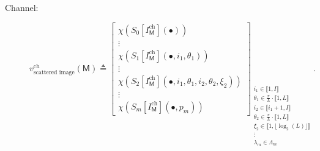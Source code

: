 \begin{description}
                \item[Channel:]
                        \begin{equation}
                            \label{eq::channel_scatnet_image_based_features}
                            v^{\text{ch}}_{\text{scattered image}}\left(\mathsf{M}\right) \triangleq \begin{bmatrix}
                                \chi \left(S_0[I^{\text{ch}}_{\mathsf{M}}]\left(\bullet\right)\right)\\
                                \vdots\\
                                \chi \left(S_1[I^{\text{ch}}_{\mathsf{M}}]\left(\bullet, i_1, \theta_1\right)\right)\\
                                \vdots\\
                                \chi \left(S_2[I^{\text{ch}}_{\mathsf{M}}]\left(\bullet, i_1, \theta_1, i_2, \theta_2, \xi_2\right)\right)\\
                                \vdots\\
                                \chi \left(S_m[I^{\text{ch}}_{\mathsf{M}}]\left(\bullet, p_m\right)\right)
                            \end{bmatrix}_{
                                \substack{
                                    i_1 \in \llbracket 1, I \rrbracket\\
                                    \theta_1 \in \frac{\pi}{L} \cdot \llbracket 1, L \rrbracket\\
                                    i_2 \in \llbracket i_1 + 1, I \rrbracket\\
                                    \theta_2 \in \frac{\pi}{L} \cdot \llbracket 1, L \rrbracket\\
                                    \xi_2 \in \llbracket 1, \lfloor\log_2(L)\rfloor \rrbracket\\
                                    \vdots\\
                                    \lambda_m \in \Lambda_m
                                }
                            }.
                        \end{equation}
            \end{description}
